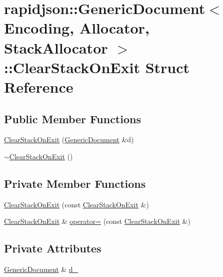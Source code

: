 \hypertarget{structrapidjson_1_1_generic_document_1_1_clear_stack_on_exit}{}\section{rapidjson\+::Generic\+Document$<$ Encoding, Allocator, Stack\+Allocator $>$\+::Clear\+Stack\+On\+Exit Struct Reference}
\label{structrapidjson_1_1_generic_document_1_1_clear_stack_on_exit}
\subsection*{Public Member Functions}
\begin{DoxyCompactItemize}
\item 
\mbox{\hyperlink{structrapidjson_1_1_generic_document_1_1_clear_stack_on_exit_a374bae3cbed4ed6c9ef473cb65612332}{Clear\+Stack\+On\+Exit}} (\mbox{\hyperlink{classrapidjson_1_1_generic_document}{Generic\+Document}} \&d)
\item 
\mbox{\hyperlink{structrapidjson_1_1_generic_document_1_1_clear_stack_on_exit_ab0059154c3b090a840c8f8558d21764a}{$\sim$\+Clear\+Stack\+On\+Exit}} ()
\end{DoxyCompactItemize}
\subsection*{Private Member Functions}
\begin{DoxyCompactItemize}
\item 
\mbox{\hyperlink{structrapidjson_1_1_generic_document_1_1_clear_stack_on_exit_a8875cd15601bedb26b795e55104e018a}{Clear\+Stack\+On\+Exit}} (const \mbox{\hyperlink{structrapidjson_1_1_generic_document_1_1_clear_stack_on_exit}{Clear\+Stack\+On\+Exit}} \&)
\item 
\mbox{\hyperlink{structrapidjson_1_1_generic_document_1_1_clear_stack_on_exit}{Clear\+Stack\+On\+Exit}} \& \mbox{\hyperlink{structrapidjson_1_1_generic_document_1_1_clear_stack_on_exit_a438e63896b8d34cafa2e43496b0287d4}{operator=}} (const \mbox{\hyperlink{structrapidjson_1_1_generic_document_1_1_clear_stack_on_exit}{Clear\+Stack\+On\+Exit}} \&)
\end{DoxyCompactItemize}
\subsection*{Private Attributes}
\begin{DoxyCompactItemize}
\item 
\mbox{\hyperlink{classrapidjson_1_1_generic_document}{Generic\+Document}} \& \mbox{\hyperlink{structrapidjson_1_1_generic_document_1_1_clear_stack_on_exit_ae8361b4c01cc90187260e77dba565fd1}{d\+\_\+}}
\end{DoxyCompactItemize}


